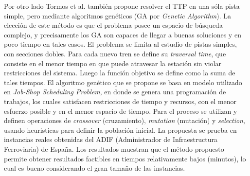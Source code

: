 \documentclass[letter, 10pt]{article}
\begin{document}
\begin{description}
	Por otro lado Tormos et al. \cite{Genetic} también propone resolver el TTP en una sóla pista simple, pero mediante algoritmos genéticos (GA por \textit{Genetic Algorithm}). La elección de este método es que el problema posee un espacio de búsqueda complejo, y precisamente los GA son capaces de llegar a buenas soluciones y en poco tiempo en tales casos. El problema se limita al estudio de pistas simples, con secciones dobles. Para cada nuevo tren se define su \textit{traversal time}, que consiste en el menor tiempo en que puede atravesar la estación sin violar restricciones del sistema. Luego la función objetivo se define como la suma de tales tiempos. El algoritmo genético que se propone se basa en modelo utilizado en \textit{Job-Shop Scheduling Problem}, en donde se genera una programación de trabajos, los cuales satisfacen restricciones de tiempo y recursos, con el menor esfuerzo posible y en el menor espacio de tiempo. Para el proceso se utilizan y definen operaciones de \textit{crossover} (cruzamiento), \textit{mutation} (mutación) y \textit{selection}, usando heuristicas para definir la población inicial. La propuesta se prueba en instancias reales obtenidas del ADIF (Administrador de Infraestructura Ferroviaria) de España. Los resultados muestran que el método propuesto permite obtener resultados factibles en tiempos relativamente bajos (minutos), lo cual es bueno considerando el gran tamaño de las instancias. 


\end{description}
\end{document}
